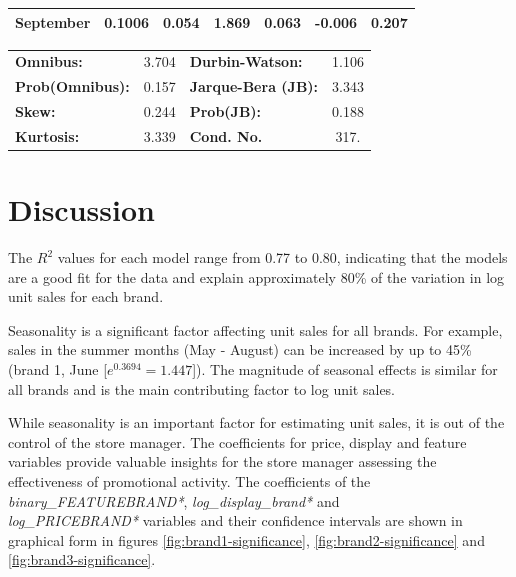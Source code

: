 \documentclass[a4paper,11pt]{article}
\begin{document}
\begin{center}
\begin{tabular}{lcccccc}
\textbf{September}             &       0.1006  &        0.054     &     1.869  &         0.063        &       -0.006    &        0.207     \\
\bottomrule
\end{tabular}
\begin{tabular}{lclc}
\textbf{Omnibus:}       &  3.704 & \textbf{  Durbin-Watson:     } &    1.106  \\
\textbf{Prob(Omnibus):} &  0.157 & \textbf{  Jarque-Bera (JB):  } &    3.343  \\
\textbf{Skew:}          &  0.244 & \textbf{  Prob(JB):          } &    0.188  \\
\textbf{Kurtosis:}      &  3.339 & \textbf{  Cond. No.          } &     317.  \\
\bottomrule
\end{tabular}
\end{center}
\newpage

\section{Discussion}

The $R^2$ values for each model range from 0.77 to 0.80, indicating that the models are a good fit for the data and explain approximately 80\% of the variation in log unit sales for each brand. 

Seasonality is a significant factor affecting unit sales for all brands. For example, sales in the summer months (May - August) can be increased by up to 45\% (brand 1, June [$e^{0.3694}=1.447$]). The magnitude of seasonal effects is similar for all brands and is the main contributing factor to log unit sales.

While seasonality is an important factor for estimating unit sales, it is out of the control of the store manager. The coefficients for price, display and feature variables provide valuable insights for the store manager assessing the effectiveness of promotional activity. The coefficients of the \textit{binary\_FEATUREBRAND*}, \textit{log\_display\_brand*} and \\ \textit{log\_PRICEBRAND*} variables and their confidence intervals are shown in graphical form in figures \ref{fig:brand1-significance}, \ref{fig:brand2-significance} and \ref{fig:brand3-significance}.
\end{document}
